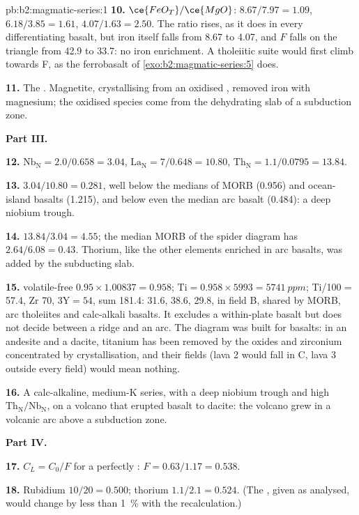\begin{solution}{pb:b2:magmatic-series:1}
\textbf{10.} $\ce{FeO_T}/\ce{MgO}$: $8.67/7.97 = 1.09$, $6.18/3.85 = 1.61$, $4.07/1.63 =
2.50$. The ratio rises, as it does in every differentiating basalt, but iron itself
falls from 8.67 to 4.07, and $F$ falls on the triangle from 42.9 to 33.7: no iron
enrichment. A tholeiitic suite would first climb towards F, as the ferrobasalt of
\cref{exo:b2:magmatic-series:5} does.

\textbf{11.} The . Magnetite, crystallising from an oxidised ,
removed iron with magnesium; the oxidised species come from the dehydrating slab of a
subduction zone.

\noindent\textbf{Part III.}

\textbf{12.} $\mathrm{Nb_N} = 2.0/0.658 = 3.04$, $\mathrm{La_N} = 7/0.648 = 10.80$,
$\mathrm{Th_N} = 1.1/0.0795 = 13.84$.

\textbf{13.} $3.04/10.80 = 0.281$, well below the medians of MORB (0.956) and
ocean-island basalts (1.215), and below even the median arc basalt (0.484): a deep
niobium trough.

\textbf{14.} $13.84/3.04 = 4.55$; the median MORB of the spider diagram has $2.64/6.08 =
0.43$. Thorium, like the other elements enriched in arc basalts, was added by the
subducting slab.

\textbf{15.}  volatile-free $0.95\times1.00837 = 0.958$; $\mathrm{Ti} =
0.958\times5993 = \qty{5741}{ppm}$; Ti/100 = 57.4, Zr 70, $3\mathrm Y = 54$, sum 181.4:
31.6, 38.6, 29.8, in field B, shared by MORB, arc tholeiites and calc-alkali basalts.
It excludes a within-plate basalt but does not decide between a ridge and an arc. The
diagram was built for basalts: in an andesite and a dacite, titanium has been removed
by the oxides and zirconium concentrated by crystallisation, and their fields (lava 2
would fall in C, lava 3 outside every field) would mean nothing.

\textbf{16.} A calc-alkaline, medium-K series, with a deep niobium trough and high
$\mathrm{Th_N}/\mathrm{Nb_N}$, on a volcano that erupted basalt to dacite: the volcano
grew in a volcanic arc above a subduction zone.

\noindent\textbf{Part IV.}

\textbf{17.} $C_L = C_0/F$ for a perfectly : $F = 0.63/1.17 =
0.538$.

\textbf{18.} Rubidium $10/20 = 0.500$; thorium $1.1/2.1 = 0.524$. (The , given as analysed, would change by less than \qty{1}{\percent} with the
recalculation.)


\end{solution}
